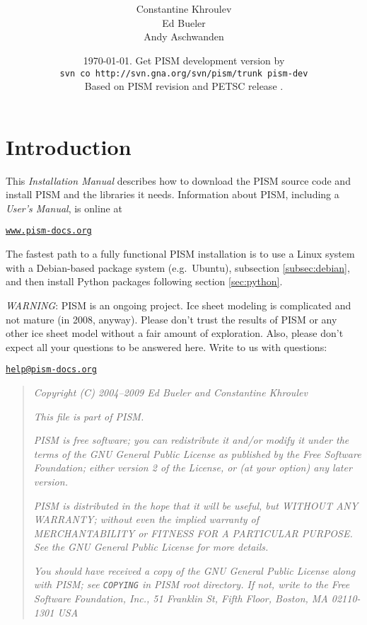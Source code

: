 \documentclass[11pt,final]{amsart}
\title[PISM Installation Manual]{\protect{\Large \emph{PISM}, a Parallel Ice
    Sheet Model:\normalsize} \\ \protect{\Large \bigskip \bigskip Installation
    Manual\normalsize}}
\author[]{Constantine Khroulev \\ Ed Bueler \\ Andy Aschwanden}
\date{\today.  Get PISM development version by \\
\phantom{foobar} \qquad\texttt{svn co http://svn.gna.org/svn/pism/trunk pism-dev} \\
Based on PISM revision \PISMREV\quad and PETSC release \PETSCREL.}
\renewcommand{\t}[1]{\texttt{#1}}
\begin{document}
\maketitle
\thispagestyle{empty}

\vspace{1.5in}
\setcounter{tocdepth}{2}
\tableofcontents



\newpage
\section*{Introduction}

\large
This \emph{Installation Manual} describes how to download the PISM source code and install PISM and the libraries it needs.  Information about PISM, including a \emph{User's Manual}, is online at
\bigskip
\begin{center}
  \href{http://www.pism-docs.org}{\t{www.pism-docs.org}}
\end{center}
\bigskip
\noindent The fastest path to a fully functional PISM installation is to use a Linux system with a Debian-based package system (e.g.~Ubuntu), subsection \ref{subsec:debian}, and then install Python packages following section \ref{sec:python}.
\vfill

\noindent\emph{WARNING}:  PISM is an ongoing project.  Ice sheet modeling is complicated and not mature (in 2008, anyway).  Please don't trust the results of PISM or any other ice sheet model without a fair amount of exploration.  Also, please don't expect all your questions to be answered here.  Write to us with questions: \bigskip

\centerline{\href{mailto:help@pism-docs.org}{\texttt{help@pism-docs.org}}}
\vfill

\begin{quote}
\textsl{Copyright (C) 2004--2009 Ed Bueler and Constantine Khroulev}
\medskip

\noindent \textsl{This file is part of PISM.}
\medskip

\noindent \textsl{PISM is free software; you can redistribute it and/or modify it under the terms of the GNU General Public
  License as published by the Free Software Foundation; either version 2 of the License, or (at your option) any later version.}
\medskip

\noindent \textsl{PISM is distributed in the hope that it will be useful, but WITHOUT ANY WARRANTY; without even the implied
  warranty of MERCHANTABILITY or FITNESS FOR A PARTICULAR PURPOSE. See the GNU General Public License for more details.} \medskip

\noindent \textsl{You should have received a copy of the GNU General Public License along
  with PISM; see \emph{\texttt{COPYING}} in PISM root directory. If not, write to the Free Software Foundation, Inc., 51 Franklin
  St, Fifth Floor, Boston, MA 02110-1301 USA}
\end{quote}
\end{document}
